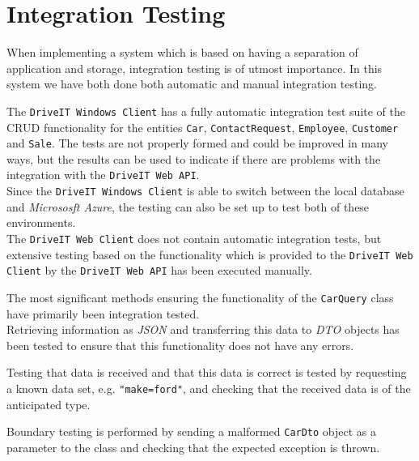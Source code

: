 \section{Integration Testing}
When implementing a system which is based on having a separation of application and storage, integration testing is of utmost importance. In this system we have both done both automatic and manual integration testing. 

The \texttt{DriveIT Windows Client} has a fully automatic integration test suite of the CRUD functionality for the entities \texttt{Car}, \texttt{ContactRequest}, \texttt{Employee}, \texttt{Customer} and \texttt{Sale}. The tests are not properly formed and could be improved in many ways, but the results can be used to indicate if there are problems with the integration with the \texttt{DriveIT Web API}.\\
Since the \texttt{DriveIT Windows Client} is able to switch between the local database and \textit{Micrososft Azure}, the testing can also be set up to test both of these environments. \\
The \texttt{DriveIT Web Client} does not contain automatic integration tests, but extensive testing based on the functionality which is provided to the \texttt{DriveIT Web Client} by the \texttt{DriveIT Web API} has been executed manually.

The most significant methods ensuring the functionality of the \texttt{CarQuery} class have primarily been integration tested.\\
Retrieving information as \textit{JSON} and transferring this data to \textit{DTO} objects has been tested to ensure that this functionality does not have any errors.

Testing that data is received and that this data is correct is tested by requesting a known data set, e.g. \texttt{"make=ford"}, and checking that the received data is of the anticipated type.

Boundary testing is performed by sending a malformed \texttt{CarDto} object as a parameter to the class and checking that the expected exception is thrown.